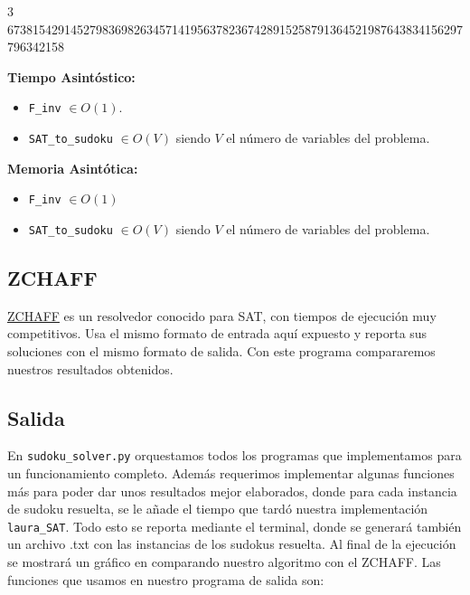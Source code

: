\documentclass[letterpaper,12pt]{article}
\begin{document}
\footnotesize{3 673815429145279836982634571419563782367428915258791364521987643834156297796342158}\\
\normalsize

\textbf{Tiempo Asintóstico:}
\begin{itemize}
	\item \texttt{F\_inv} $\in O(1)$.
	\item \texttt{SAT\_to\_sudoku} $\in O(V)$ siendo $V$ el número de variables del problema.\\
\end{itemize}


\textbf{Memoria Asintótica:}
\begin{itemize}
	\item \texttt{F\_inv} $\in O(1)$
	\item \texttt{SAT\_to\_sudoku} $\in O(V)$ siendo $V$ el número de variables del problema.\\
\end{itemize}

\subsection{ZCHAFF}

\href{https://www.princeton.edu/~chaff/zchaff.html}{ZCHAFF} es un resolvedor conocido para SAT, con tiempos de ejecución muy competitivos. Usa el mismo formato de entrada aquí expuesto y reporta sus soluciones con el mismo formato de salida. Con este programa compararemos nuestros resultados obtenidos.

\subsection{Salida}

En \texttt{sudoku\_solver.py} orquestamos todos los programas que implementamos para un funcionamiento completo. Además requerimos implementar algunas funciones más para poder dar unos resultados mejor elaborados, donde para cada instancia de sudoku resuelta, se le añade el tiempo que tardó nuestra implementación \texttt{laura\_SAT}. Todo esto se reporta mediante el terminal, donde se generará también un archivo .txt con las instancias de los sudokus resuelta. Al final de la ejecución se mostrará un gráfico en comparando nuestro algoritmo con el ZCHAFF. Las funciones que usamos en nuestro programa de salida son:\\
\end{document}
